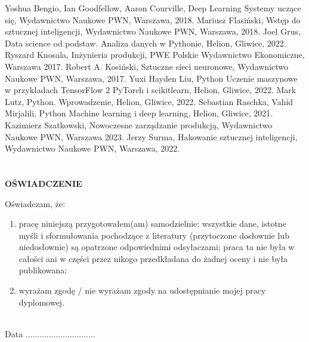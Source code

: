 \documentclass[12pt,a4paper,twoside,openright]{report}
\author{Kamil Piech}
\begin{document}
\captionsetup{font=footnotesize}
    \begin{titlepage}
    
    \end{titlepage}
    \tableofcontents
\begingroup
\setlength{\parindent}{0.7cm}

    
    
    
    
    
    
    
\endgroup
\medskip

\renewcommand\bibname{\vspace{-2cm}\large{Bibliografia}}
\renewcommand\listfigurename{\vspace{-2cm}\large{Spis rysunków}}
\renewcommand\listtablename{\vspace{-2cm}\large{Spis tabel}}
\begin{thebibliography}{12} 
 Yoshua Bengio, Ian Goodfellow, Aaron Courville, Deep Learning Systemy uczące się, Wydawnictwo Naukowe PWN, Warszawa, 2018.
 Mariusz Flasiński, Wstęp do sztucznej inteligencji, Wydawnictwo Naukowe PWN, Warszawa, 2018.
 Joel Grus, Data science od podstaw. Analiza danych w Pythonie, Helion, Gliwice, 2022.
 Ryszard Knosala, Inżynieria produkcji, PWE Polskie Wydawnictwo Ekonomiczne, Warszawa 2017.
 Robert A. Kosiński, Sztuczne sieci neuronowe, Wydawnictwo Naukowe PWN, Warszawa, 2017.
 Yuxi Hayden Liu, Python Uczenie maszynowe w przykładach TensorFlow 2 PyTorch i scikitlearn, Helion, Gliwice, 2022.
 Mark Lutz, Python. Wprowadzenie, Helion, Gliwice, 2022.
 Sebastian Raschka, Vahid Mirjalili, Python Machine learning i deep learning, Helion, Gliwice, 2021.
 Kazimierz Szatkowski, Nowoczesne zarządzanie produkcją, Wydawnictwo Naukowe PWN, Warszawa 2023.
 Jerzy Surma, Hakowanie sztucznej inteligencji, Wydawnictwo Naukowe PWN, Warszawa, 2022.
\end{thebibliography}

\newpage
\listoffigures
\newpage
\listoftables

\newpage

\chapter*{}
\centering\textbf{OŚWIADCZENIE\\[6mm]}
\raggedright
Oświadczam, że: 
\begin{enumerate}
    \item pracę niniejszą przygotowałem(am) samodzielnie; wszystkie dane, istotne myśli i sformułowania pochodzące 
z literatury (przytoczone dosłownie lub niedosłownie) są opatrzone odpowiednimi odsyłaczami; praca ta nie była 
w całości ani w części przez nikogo przedkładana do żadnej oceny i nie była publikowana;
    \item wyrażam zgodę / nie wyrażam zgody na udostępnianie mojej pracy dyplomowej. 
\end{enumerate}\\[10mm]
Data ..............................\\[15mm]
\end{document}
